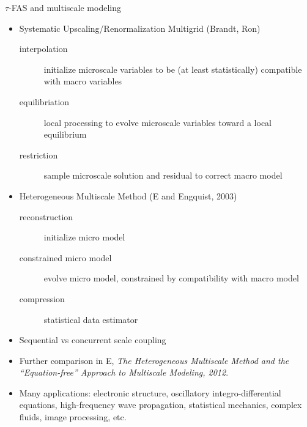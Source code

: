 \begin{frame}{$\tau$-FAS and multiscale modeling}
  \begin{itemize}
  \item Systematic Upscaling/Renormalization Multigrid (Brandt, Ron)
    \begin{description}
    \item[interpolation] initialize microscale variables to be (at least statistically) compatible with macro variables
    \item[equilibriation] local processing to evolve microscale variables toward a local equilibrium
    \item[restriction] sample microscale solution and residual to correct macro model
    \end{description}
  \item Heterogeneous Multiscale Method (E and Engquist, 2003)
    \begin{description}
    \item[reconstruction] initialize micro model
    \item[constrained micro model] evolve micro model, constrained by compatibility with macro model
    \item[compression] statistical data estimator
    \end{description}
  \item Sequential vs concurrent scale coupling
  \item Further comparison in E, \textit{The Heterogeneous Multiscale Method and the ``Equation-free'' Approach to Multiscale Modeling, 2012}.
  \item Many applications: electronic structure, oscillatory integro-differential equations, high-frequency wave propagation, statistical mechanics, complex fluids, image processing, etc.
  \end{itemize}
\end{frame}
